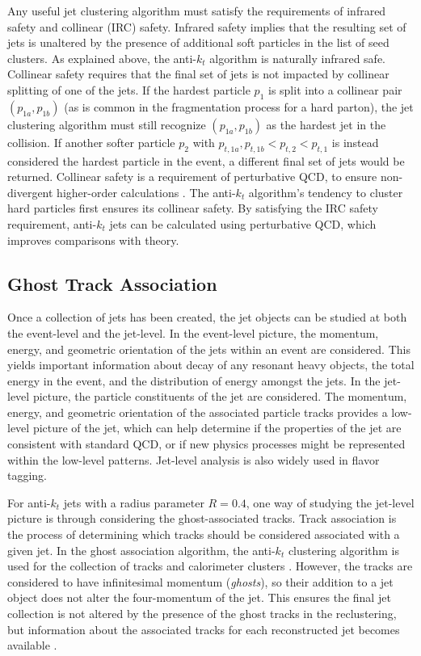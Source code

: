 Any useful jet clustering algorithm must satisfy the requirements of infrared safety and collinear (IRC) safety. Infrared safety implies that the resulting set of jets is unaltered by the presence of additional soft particles in the list of seed clusters. As explained above, the anti-$k_t$ algorithm is naturally infrared safe. Collinear safety requires that the final set of jets is not impacted by collinear splitting of one of the jets. If the hardest particle $p_1$ is split into a collinear pair $(p_{1a},p_{1b})$ (as is common in the fragmentation process for a hard parton), the jet clustering algorithm must still recognize $(p_{1a},p_{1b})$ as the hardest jet in the collision. If another softer particle $p_2$ with $p_{t,1a},p_{t,1b} < p_{t,2} < p_{t,1}$ is instead considered the hardest particle in the event, a different final set of jets would be returned. Collinear safety is a requirement of perturbative QCD, to ensure non-divergent higher-order calculations \cite{collinear_safety}. The anti-$k_t$ algorithm's tendency to cluster hard particles first ensures its collinear safety. By satisfying the IRC safety requirement, anti-$k_t$ jets can be calculated using perturbative QCD, which improves comparisons with theory. 
 
\subsection{Ghost Track Association}
\label{sec:ghost}
Once a collection of jets has been created, the jet objects can be studied at both the event-level and the jet-level. In the event-level picture, the momentum, energy, and geometric orientation of the jets within an event are considered. This yields important information about decay of any resonant heavy objects, the total energy in the event, and the distribution of energy amongst the jets. In the jet-level picture, the particle constituents of the jet are considered. The momentum, energy, and geometric orientation of the associated particle tracks provides a low-level picture of the jet, which can help determine if the properties of the jet are consistent with standard QCD, or if new physics processes might be represented within the low-level patterns. Jet-level analysis is also widely used in flavor tagging. \par

For anti-$k_t$ jets with a radius parameter $R=0.4$, one way of studying the jet-level picture is through considering the ghost-associated tracks. Track association is the process of determining which tracks should be considered associated with a given jet. In the ghost association algorithm, the anti-$k_t$ clustering algorithm is used for the collection of tracks and calorimeter clusters \cite{ghosts2}. However, the tracks are considered to have infinitesimal momentum (\textit{ghosts}), so their addition to a jet object does not alter the four-momentum of the jet. This ensures the final jet collection is not altered by the presence of the ghost tracks in the reclustering, but information about the associated tracks for each reconstructed jet becomes available \cite{ghosts1}. \par

